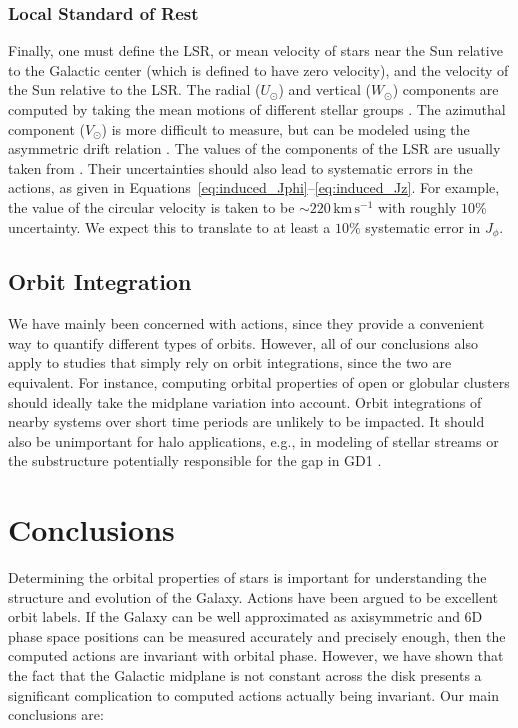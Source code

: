 \documentclass[twocolumn]{aastex62}
\newcommand{\kms}{\text{km}\,\text{s}^{-1}}
\begin{document}
\subsubsection{Local Standard of Rest}
Finally, one must define the LSR, or mean velocity of stars near the Sun
relative to the Galactic center (which is defined to have zero velocity), and
the velocity of the Sun relative to the LSR. The radial ($U_{\odot}$) and
vertical ($W_{\odot}$) components are computed by taking the mean motions of
different stellar groups \citep[e.g.,][]{2012MNRAS.427..274S}. The azimuthal
component ($V_{\odot}$) is more difficult to measure, but can be modeled using
the asymmetric drift relation \citep{2008gady.book.....B}. The values of the
components of the LSR are usually taken from \citet{2010MNRAS.403.1829S}.
Their uncertainties should also lead to systematic errors in the actions, as
given in Equations~\eqref{eq:induced_Jphi}--\eqref{eq:induced_Jz}. For
example, the value of the circular velocity is taken to be $\sim 220\,\kms$
\citep[e.g.,][]{2012ApJ...759..131B} with roughly $10\%$ uncertainty. We
expect this to translate to at least a $10\%$ systematic error in $J_{\phi}$.

\subsection{Orbit Integration}\label{ssec:orbit_integrate}
We have mainly been concerned with actions, since they provide a convenient
way to quantify different types of orbits. However, all of our conclusions
also apply to studies that simply rely on orbit integrations, since the two
are equivalent. For instance, computing orbital properties of open or globular
clusters \citep[e.g.,][]{2016A&A...588A.120C, 2018A&A...615A..49C,
2018A&A...616A..12G} should ideally take the midplane variation into account.
Orbit integrations of nearby systems over short time periods
\citep[e.g.,][]{2014MNRAS.445.2169M, 2018A&A...616A..37B} are unlikely to be
impacted. It should also be unimportant for halo applications, e.g., in
modeling of stellar streams \citep[e.g.,][]{2014ApJ...795...95B} or the
substructure potentially responsible for the gap in GD1
\citep{2018arXiv181103631B}.

\section{Conclusions}\label{sec:conclusion}
Determining the orbital properties of stars is important for understanding the
structure and evolution of the Galaxy. Actions have been argued to be
excellent orbit labels. If the Galaxy can be well approximated as axisymmetric
and 6D phase space positions can be measured accurately and precisely enough,
then the computed actions are invariant with orbital phase. However, we have
shown that the fact that the Galactic midplane is not constant across the disk
presents a significant complication to computed actions actually being
invariant. Our main conclusions are:
\end{document}
